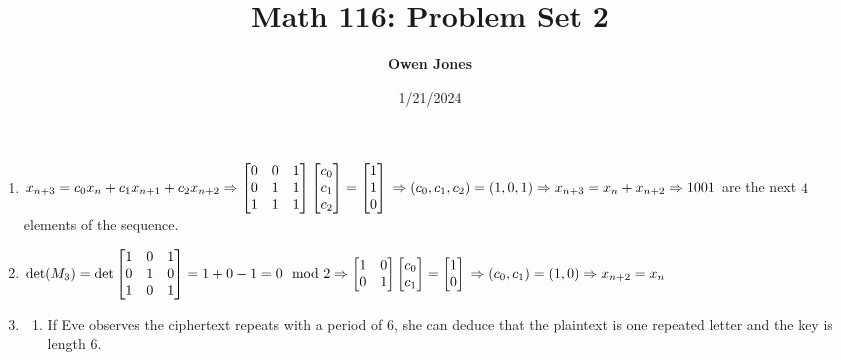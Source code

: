 \documentclass[10pt]{article}
\title{\bf Math 116: Problem Set 2}
\date{1/21/2024}
\author{\bf Owen Jones}
\begin{document}
\maketitle
\begin{enumerate}[label=\arabic*.]
    \item $x_{n+3}=c_0x_n+c_1x_{n+1}+c_2x_{n+2}\\
    \Rightarrow \begin{bmatrix}
        0 & 0 & 1\\
        0 & 1 & 1\\
        1 & 1 & 1
    \end{bmatrix}\begin{bmatrix}
        c_0\\
        c_1\\
        c_2
    \end{bmatrix}=\begin{bmatrix}
        1\\
        1\\
        0
    \end{bmatrix}\\
    \Rightarrow (c_0,c_1,c_2)=(1,0,1)\\
    \Rightarrow x_{n+3}=x_n+x_{n+2}\\
    \Rightarrow 1001$ are the next $4$ elements of the sequence.
    \item $\det(M_3)=\det\begin{bmatrix}
        1 & 0 & 1\\
        0 & 1 & 0\\
        1 & 0 & 1
    \end{bmatrix}=1+0-1=0\mod 2\\
    \Rightarrow \begin{bmatrix}
        1 & 0\\
        0 & 1
    \end{bmatrix}\begin{bmatrix}
        c_0\\
        c_1
    \end{bmatrix}=\begin{bmatrix}
        1\\
        0
    \end{bmatrix}\\
    \Rightarrow (c_0,c_1)=(1,0)\\
    \Rightarrow x_{n+2}=x_n$
    \item \begin{enumerate}
        \item If Eve observes the ciphertext repeats with a period of $6$, she can deduce that the plaintext is one repeated letter and the key is length $6$.

\end{enumerate}
\end{enumerate}
\end{document}
